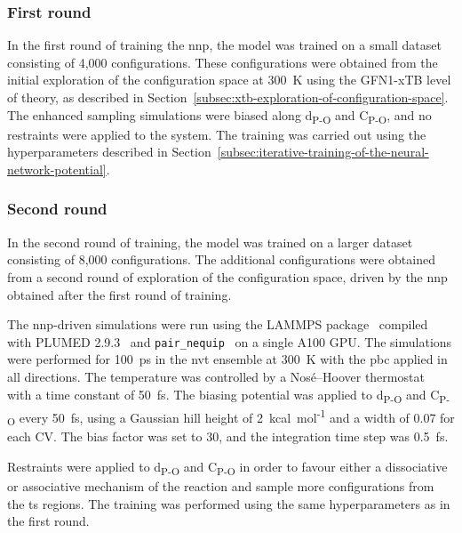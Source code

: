 \subsubsection{First round}
In the first round of training the \ac{nnp}, the model was trained on a small dataset consisting of 4,000 configurations. These configurations were obtained from the initial exploration of the configuration space at 300~K using the GFN1-xTB level of theory, as described in Section~\ref{subsec:xtb-exploration-of-configuration-space}. The enhanced sampling simulations were biased along d\textsubscript{P-O} and C\textsubscript{P-O}, and no restraints were applied to the system. The training was carried out using the hyperparameters described in Section~\ref{subsec:iterative-training-of-the-neural-network-potential}.



\subsubsection{Second round}
In the second round of training, the model was trained on a larger dataset consisting of 8,000 configurations. The additional configurations were obtained from a second round of exploration of the configuration space, driven by the \ac{nnp} obtained after the first round of training.

The \ac{nnp}-driven simulations were run using the LAMMPS package~\citep{thompsonLAMMPSFlexibleSimulation2022} compiled with PLUMED 2.9.3~\citep{tribelloPLUMED2New2014} and \texttt{pair\_nequip}~\citep{MirgroupPair_nequip} on a single A100 GPU. The simulations were performed for 100~ps in the \ac{nvt} ensemble at 300~K with the \ac{pbc} applied in all directions. The temperature was controlled by a Nos\'e--Hoover thermostat~\citep{noseUnifiedFormulationConstant1984, hooverCanonicalDynamicsEquilibrium1985} with a time constant of 50~fs. The biasing potential was applied to d\textsubscript{P-O} and C\textsubscript{P-O} every 50~fs, using a Gaussian hill height of 2~kcal~mol\textsuperscript{-1} and a width of 0.07 for each CV. The bias factor was set to 30, and the integration time step was 0.5~fs.

Restraints were applied to d\textsubscript{P-O} and C\textsubscript{P-O} in order to favour either a dissociative or associative mechanism of the reaction and sample more configurations from the \ac{ts} regions. The training was performed using the same hyperparameters as in the first round.



